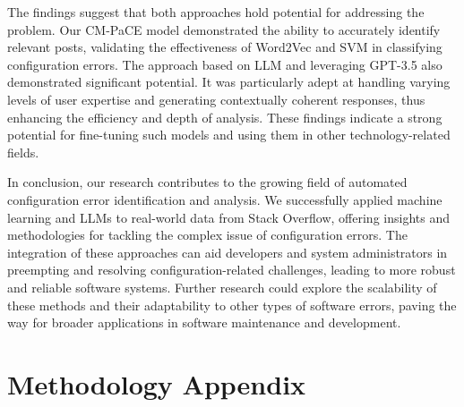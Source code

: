 \documentclass[english,bachelor]{swsLeipzig}
\begin{document}
The findings suggest that both approaches hold potential for addressing the problem. Our CM-PaCE model demonstrated the ability to accurately identify relevant posts, validating the effectiveness of Word2Vec and SVM in classifying configuration errors. The approach based on LLM and leveraging GPT-3.5 also demonstrated significant potential. It was particularly adept at handling varying levels of user expertise and generating contextually coherent responses, thus enhancing the efficiency and depth of analysis. These findings indicate a strong potential for fine-tuning such models and using them in other technology-related fields.

In conclusion, our research contributes to the growing field of automated configuration error identification and analysis. We successfully applied machine learning and LLMs to real-world data from Stack Overflow, offering insights and methodologies for tackling the complex issue of configuration errors. The integration of these approaches can aid developers and system administrators in preempting and resolving configuration-related challenges, leading to more robust and reliable software systems. Further research could explore the scalability of these methods and their adaptability to other types of software errors, paving the way for broader applications in software maintenance and development.

\appendix

\chapter{Methodology Appendix}
\end{document}
